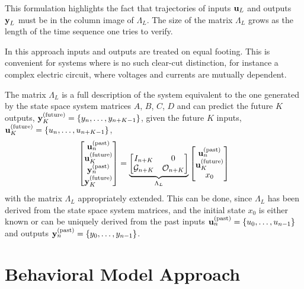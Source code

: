 This formulation highlights the fact that trajectories of inputs $\boldsymbol{\mathrm{u}}_L$ and outputs $\boldsymbol{\mathrm{y}}_L$ must be in the column image of $\Lambda_L$. The size of the matrix $\Lambda_L$ grows as the length of the time sequence one tries to verify.

In this approach inputs and outputs are treated on equal footing. This is convenient for systems where is no such clear-cut distinction, for instance a complex electric circuit, where voltages and currents are mutually dependent.

The matrix $\Lambda_L$ is a full description of the system equivalent to the one generated by the state space system matrices $A$, $B$, $C$, $D$ and can predict the future $K$ outputs, $\boldsymbol{\mathrm{y}}_K^{(\textrm{future})} = \{y_n,\ldots,y_{n+K-1}\}$, given the future $K$ inputs, $\boldsymbol{\mathrm{u}}_K^{(\textrm{future})} = \{u_n,\ldots,u_{n+K-1}\}$,
\begin{equation*}
  \begin{bmatrix}
    \boldsymbol{\mathrm{u}}_n^{(\textrm{past})} \\ \boldsymbol{\mathrm{u}}_K^{(\textrm{future})} \\ \boldsymbol{\mathrm{y}}_n^{(\textrm{past})} \\ \boldsymbol{\mathrm{y}}_K^{(\textrm{future})}
  \end{bmatrix} = \underbrace{
  \begin{bmatrix}
    I_{n+K} & 0 \\ \mathcal{G}_{n+K} & \mathcal{O}_{n+K}
  \end{bmatrix}}_{\Lambda_L}
  \begin{bmatrix}
    \boldsymbol{\mathrm{u}}_n^{(\textrm{past})} \\ \boldsymbol{\mathrm{u}}_K^{(\textrm{future})} \\ x_0
  \end{bmatrix}
\end{equation*}
with the matrix $\Lambda_L$ appropriately extended. This can be done, since $\Lambda_L$ has been derived from the state space system matrices, and the initial state $x_0$ is either known or can be uniquely derived from the past inputs $\boldsymbol{\mathrm{u}}_n^{(\textrm{past})} = \{u_0,\ldots,u_{n-1}\}$ and outputs $\boldsymbol{\mathrm{y}}_n^{(\textrm{past})} = \{y_0,\ldots,y_{n-1}\}$.

\section{Behavioral Model Approach}
\label{sec:behavioral-model-approach}

